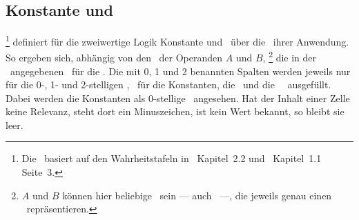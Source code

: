 \section[Aussagenlogik]{\Aussagenlogik}%
\beginsection          {\Aussagenlogik}
\label              {sec:Aussagenlogik}

\subsection[Konstante und Operationen]{Konstante und \Operationen}%
\label               {sub:Operationen}

%
\footnote{%
	Die \tablename\ basiert auf den Wahrheitstafeln in~\cite{bib:JunktorMoeglich} Kapitel~2.2 und~\cite{bib:Rautenberg} Kapitel~1.1 Seite~3.
}
definiert für die zweiwertige Logik Konstante und \Junktoren\ über die \Wahrheitswerte\ ihrer Anwendung.
So ergeben sich, abhängig von den \Wahrheitswerten\ der Operanden $A$ und $B$,%
\footnote{%
	$A$ und $B$ können hier beliebige \Aussagen\ sein --- auch \Formeln\ ---, die jeweils genau einen \Wahrheitswert\ repräsentieren.
}
die in der \tablename\ angegebenen \Wahrheitswerte\ für die \Operationen.
Die mit 0, 1 und 2 benannten Spalten werden jeweils nur für die 0-, 1- und 2-stelligen \Junktoren, \textdh\ für die Konstanten, die \unaeren\ und die \binaeren\ \Junktoren\ ausgefüllt.
Dabei werden die Konstanten als 0-stellige \Junktoren\ angesehen.
Hat der Inhalt einer Zelle keine Relevanz, steht dort ein Minuszeichen, ist kein Wert bekannt, so bleibt sie leer.

\newcommand{\alleMoeglichenJunktoren}{
	Um vollständig zu sein, \textdh\ alle 22 möglichen Kombinationen von \Wahrheitswerten\ für höchstens zwei Variable zu berücksichtigen, enthält die \tablename\ auch viele ungebräuchliche \Symbole\ und \Operationen.
	\Junktoren\ ohne Angabe einer Priorität sind \hier\ nicht weiter von Interesse.
	--- Im Folgenden werden von den in der Tabelle aufgeführten \Junktoren\ nur noch \defSym{\OjkFalse}, \defSym{\OjkTrue}, \defSym{\OjkNot}, \defSym{\OjkAnd}, \defSym{\OjkOr}, \defSym{\OjkImp}, \defSym{\OjkRep}, \defSym{\OjkEquiv}, \defSym{\OjkNand}, \defSym{\OjkNor} und \defSym{\OjkXor} verwendet.
}

